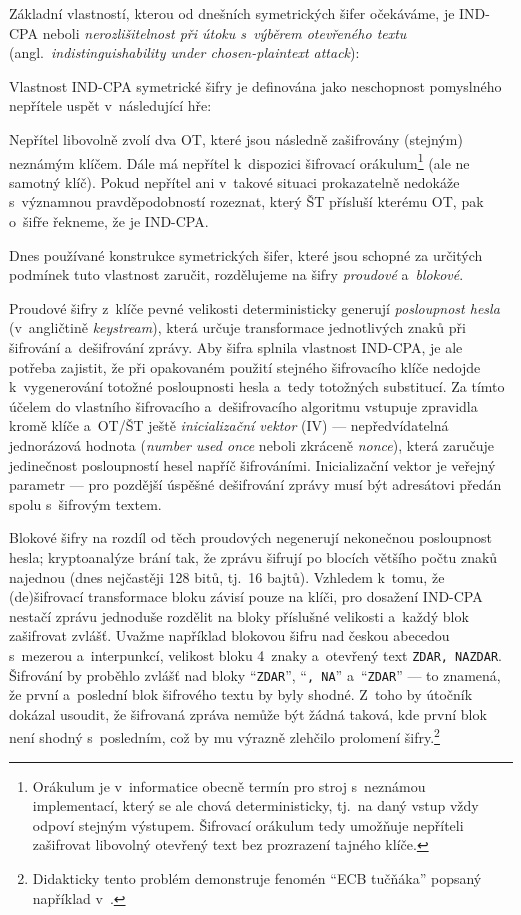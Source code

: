 Základní vlastností, kterou od dnešních symetrických šifer očekáváme, je IND-CPA neboli \emph{nerozlišitelnost při útoku s~výběrem otevřeného textu} (angl.~\textit{indistinguishability under chosen-plaintext attack}):

\begin{definition}
    Vlastnost IND-CPA symetrické šifry je definována jako neschopnost pomyslného nepřítele uspět v~následující hře:

    Nepřítel libovolně zvolí dva OT, které jsou následně zašifrovány (stejným) neznámým klíčem. Dále má nepřítel k~dispozici šifrovací orákulum\footnote{Orákulum je v~informatice obecně termín pro stroj s~neznámou implementací, který se ale chová deterministicky, tj.~na daný vstup vždy odpoví stejným výstupem. Šifrovací orákulum tedy umožňuje nepříteli zašifrovat libovolný otevřený text bez prozrazení tajného klíče.} (ale ne samotný klíč). Pokud nepřítel ani v~takové situaci prokazatelně nedokáže s~významnou pravděpodobností rozeznat, který ŠT přísluší kterému OT, pak o~šifře řekneme, že je IND-CPA.~\cite{das2014iv}
\end{definition}

Dnes používané konstrukce symetrických šifer, které jsou schopné za určitých podmínek tuto vlastnost zaručit, rozdělujeme na šifry \emph{proudové} a~\emph{blokové}.

Proudové šifry z~klíče pevné velikosti deterministicky generují \emph{posloupnost hesla} (v~angličtině \textit{keystream}), která určuje transformace jednotlivých znaků při šifrování a~dešifrování zprávy. Aby šifra splnila vlastnost IND-CPA, je ale potřeba zajistit, že při opakovaném použití stejného šifrovacího klíče nedojde k~vygenerování totožné posloupnosti hesla a~tedy totožných substitucí. Za tímto účelem do vlastního šifrovacího a~dešifrovacího algoritmu vstupuje zpravidla kromě klíče a~OT/ŠT ještě \emph{inicializační vektor} (IV) --- nepředvídatelná jednorázová hodnota (\textit{number used once} neboli zkráceně \textit{nonce}), která zaručuje jedinečnost posloupností hesel napříč šifrováními. Inicializační vektor je veřejný parametr --- pro pozdější úspěšné dešifrování zprávy musí být adresátovi předán spolu s~šifrovým textem.

Blokové šifry na rozdíl od těch proudových negenerují nekonečnou posloupnost hesla; kryptoanalýze brání tak, že zprávu šifrují po blocích většího počtu znaků najednou (dnes nejčastěji 128 bitů, tj.\ 16 bajtů). Vzhledem k~tomu, že (de)šifrovací transformace bloku závisí pouze na klíči, pro dosažení IND-CPA nestačí zprávu jednoduše rozdělit na bloky příslušné velikosti a~každý blok zašifrovat zvlášť. Uvažme například blokovou šifru nad českou abecedou s~mezerou a~interpunkcí, velikost bloku 4~znaky a~otevřený text \texttt{ZDAR, NAZDAR}. Šifrování by proběhlo zvlášť nad bloky ``\texttt{ZDAR}'', ``\texttt{, NA}'' a~``\texttt{ZDAR}'' --- to znamená, že první a~poslední blok šifrového textu by byly shodné. Z~toho by útočník dokázal usoudit, že šifrovaná zpráva nemůže být žádná taková, kde první blok není shodný s~posledním, což by mu výrazně zlehčilo prolomení šifry.\footnote{Didakticky tento problém demonstruje fenomén ``ECB tučňáka'' popsaný například v~\cite{ecbpenguin}.}

